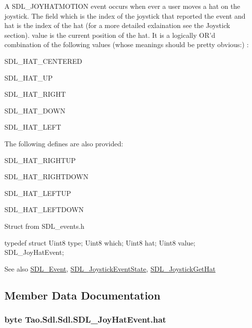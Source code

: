 A SDL\_\-JOYHATMOTION event occurs when ever a user moves a hat on the joystick. The field which is the index of the joystick that reported the event and hat is the index of the hat (for a more detailed exlaination see the Joystick section). value is the current position of the hat. It is a logically OR'd combination of the following values (whose meanings should be pretty obvious:) : 

SDL\_\-HAT\_\-CENTERED 

SDL\_\-HAT\_\-UP 

SDL\_\-HAT\_\-RIGHT 

SDL\_\-HAT\_\-DOWN 

SDL\_\-HAT\_\-LEFT 

The following defines are also provided: 

SDL\_\-HAT\_\-RIGHTUP 

SDL\_\-HAT\_\-RIGHTDOWN 

SDL\_\-HAT\_\-LEFTUP 

SDL\_\-HAT\_\-LEFTDOWN 

Struct from SDL\_\-events.h 
\begin{DoxyCode}
            typedef struct{
                        Uint8 type;
                        Uint8 which;
                        Uint8 hat;
                        Uint8 value;
                } SDL_JoyHatEvent;
\end{DoxyCode}
 \begin{DoxySeeAlso}{See also}
\hyperlink{struct_tao_1_1_sdl_1_1_s_d_l___event}{SDL\_\-Event}, \hyperlink{_sdl_8cs_a4b5786d792bade406949c738f0290eca}{SDL\_\-JoystickEventState}, \hyperlink{_sdl_8cs_aa92ba2b7e2f685e0fe7587b73cbd8f22}{SDL\_\-JoystickGetHat}


\end{DoxySeeAlso}


\subsection{Member Data Documentation}
\hypertarget{struct_tao_1_1_sdl_1_1_sdl_1_1_s_d_l___joy_hat_event_af4a1d5fb1c29cb4359322b7341d4db42}{
\subsubsection[{hat}]{\setlength{\rightskip}{0pt plus 5cm}byte {\bf Tao.Sdl.Sdl.SDL\_\-JoyHatEvent.hat}}}
\label{struct_tao_1_1_sdl_1_1_sdl_1_1_s_d_l___joy_hat_event_af4a1d5fb1c29cb4359322b7341d4db42}


